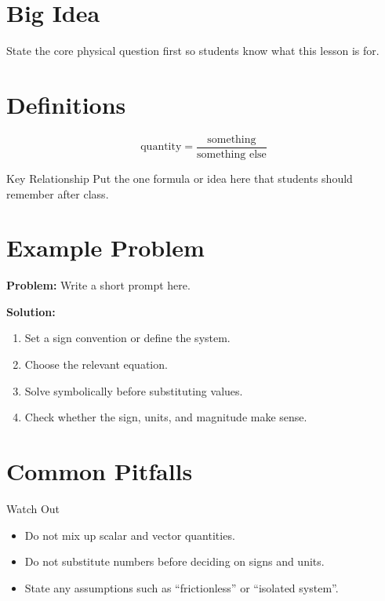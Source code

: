 



\maketitle

\section{Big Idea}
State the core physical question first so students know what this lesson is for.

\section{Definitions}
\begin{equation}
    \text{quantity} = \frac{\text{something}}{\text{something else}}
\end{equation}

\begin{keyidea}{Key Relationship}
Put the one formula or idea here that students should remember after class.
\end{keyidea}

\section{Example Problem}
\textbf{Problem:} Write a short prompt here.

\textbf{Solution:}
\begin{enumerate}
    \item Set a sign convention or define the system.
    \item Choose the relevant equation.
    \item Solve symbolically before substituting values.
    \item Check whether the sign, units, and magnitude make sense.
\end{enumerate}

\section{Common Pitfalls}
\begin{pitfall}{Watch Out}
\begin{itemize}
    \item Do not mix up scalar and vector quantities.
    \item Do not substitute numbers before deciding on signs and units.
    \item State any assumptions such as ``frictionless'' or ``isolated system''.
\end{itemize}
\end{pitfall}


